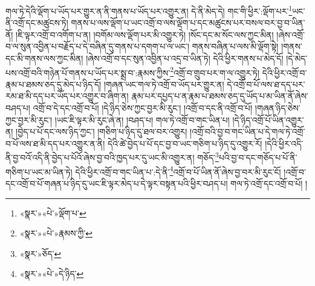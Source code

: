གལ་ཏེ་དེའི་ལྡོག་པ་ཡོད་པར་གྱུར་ན་ནི་གནས་པ་ཡོད་པར་འགྱུར་ན། དེ་ནི་མེད་དེ། གང་གི་ཕྱིར་:ལྡོག་པར་\footnote{«སྣར་»«པེ་»ལྡོག་པ་}ཡང་ནི་འགྲོ་དང་མཚུངས་ཏེ། གནས་པ་ལས་ལྡོག་པ་ཡང་འགྲོ་བ་ལས་ལྡོག་པ་དང་མཚུངས་པར་བསལ་བར་བྱ་བ་ཡིན་ནོ། །ཇི་ལྟར་འགྲོ་བ་འགོག་པ་ན། །བགོམ་ལས་ལྡོག་པར་མི་འགྱུར་ཏེ། །སོང་དང་མ་སོང་ལས་ཀྱང་མིན། །ཞེས་འགྲོ་བ་ལ་སུན་འབྱིན་པ་བརྗོད་པ་དེ་བཞིན་དུ་གནས་པ་དགག་པ་ལ་ཡང་། གནས་བཞིན་པ་ལས་མི་ལྡོག་སྟེ། །གནས་དང་མི་གནས་ལས་ཀྱང་མིན། །ཞེས་འགྲོ་བ་དང་སུན་འབྱིན་པ་འདྲ་བ་ཡིན་ཏེ། དེའི་ཕྱིར་གནས་པ་མེད་དོ། །དེ་མེད་པས་འགྲོ་བའི་གཉེན་པོ་གནས་པ་ཡོད་པར་སྨྲ་བ་:རྣམས་ཀྱིས་\footnote{«སྣར་»«པེ་»རྣམས་ཀྱི་}འགྲོ་བ་གྲུབ་པར་ག་ལ་འགྱུར་ཏེ། དེའི་ཕྱིར་འགྲོ་བ་རྣམ་པ་ཐམས་ཅད་དུ་མེད་པ་ཉིད་དོ། །གཞན་ཡང་གལ་ཏེ་འགྲོ་བ་ཡོད་པར་གྱུར་ན། དེ་འགྲོ་བ་པོ་ལས་ཐ་དད་པར་རམ་ཐ་མི་དད་པར་ཡོད་པར་འགྱུར་བ་ཞིག་ན། རྣམ་པར་དཔྱད་པ་ན་རྣམ་པ་ཐམས་ཅད་དུ་ཡོད་པ་མ་ཡིན་ནོ་ཞེས་བཤད་པ། འགྲོ་བ་དེ་དང་འགྲོ་བ་པོ། །དེ་ཉིད་ཅེས་ཀྱང་བྱར་མི་རུང་། །འགྲོ་བ་དང་ནི་འགྲོ་བ་པོ། །གཞན་ཉིད་ཅེས་ཀྱང་བྱར་མི་རུང་། །ཡང་ཇི་ལྟར་མི་རུང་ཞེ་ན། །བཤད་པ། གལ་ཏེ་འགྲོ་བ་གང་ཡིན་པ། །དེ་ཉིད་འགྲོ་པོ་ཡིན་འགྱུར་ན། །བྱེད་པ་པོ་དང་ལས་ཉིད་ཀྱང་། །གཅིག་པ་ཉིད་དུ་ཐལ་བར་འགྱུར། །འགྲོ་བའི་བྱ་བ་གང་ཡིན་པ་དེ་གལ་ཏེ་འགྲོ་བ་པོ་ལས་ཐ་མི་དད་པར་འགྱུར་ན་ནི། དེའི་ཚེ་བྱེད་པ་པོ་དང་བྱ་བ་ཡང་གཅིག་པ་ཉིད་དུ་འགྱུར་རོ། །དེའི་ཕྱིར་འདི་ནི་བྱ་བའོ་འདི་ནི་བྱེད་པ་པོའོ་ཞེས་བྱ་བའི་ཁྱད་པར་དུ་ཡང་མི་འགྱུར་ན། གཅོད་\footnote{«སྣར་»ཅོད་}པའི་བྱ་བ་དང་གཅོད་པ་པོ་ནི་གཅིག་པ་ཡང་མ་ཡིན་ཏེ། དེའི་ཕྱིར་འགྲོ་བ་གང་ཡིན་པ་:དེ་ནི་\footnote{«སྣར་»«པེ་»དེ་ཉིད་}འགྲོ་བ་པོ་ཡིན་ནོ་ཞེས་བྱ་བར་མི་རུང་ངོ། །འགྲོ་བ་དང་འགྲོ་བ་པོ་གཞན་པ་ཉིད་དུ་ཡང་ཇི་ལྟར་མེད་པ་དེ་ལྟར་བསྟན་པའི་ཕྱིར་བཤད་པ། གལ་ཏེ་འགྲོ་དང་འགྲོ་བ་པོ། །
